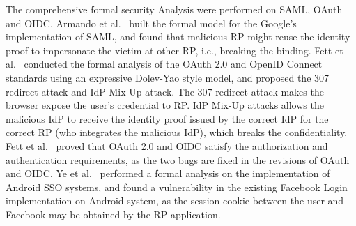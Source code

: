 The comprehensive formal security Analysis were performed on SAML, OAuth and OIDC. Armando et al.~\cite{ArmandoCCCT08} built the formal model for the Google's implementation of SAML,
and found that  malicious RP might reuse the identity proof to impersonate the victim at other RP, i.e., breaking the binding.
Fett et al.~\cite{FettKS16, FettKS17} conducted the formal analysis of the OAuth 2.0 and OpenID Connect standards using an expressive Dolev-Yao style model,
and proposed the 307 redirect attack and IdP Mix-Up attack.
The 307 redirect attack makes the browser expose the user's  credential to RP.
IdP Mix-Up attacks allows the malicious IdP to receive the identity proof issued by the correct IdP for the correct RP (who integrates the malicious IdP), which breaks the confidentiality.
Fett et al.~\cite{FettKS16, FettKS17} proved that OAuth 2.0 and OIDC  satisfy the authorization and authentication requirements, as the two bugs are fixed in the revisions of OAuth and OIDC.
Ye et al.~\cite{YeBWD15} performed a formal analysis on the implementation of Android SSO systems,
 and found a vulnerability in the existing Facebook Login implementation on Android system, as the session cookie between the user and Facebook may be obtained by the RP application.




